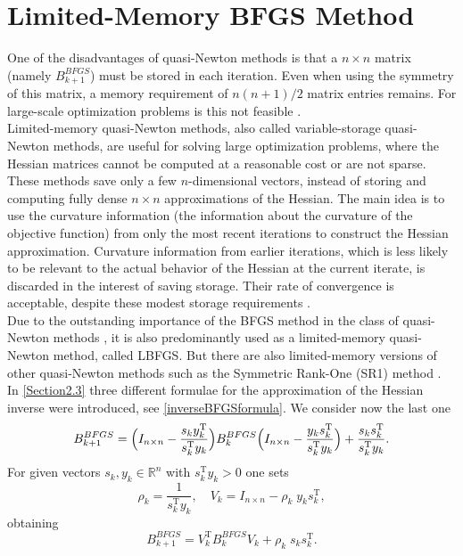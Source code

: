 \section{Limited-Memory BFGS Method}
\label{Section2.6}

One of the disadvantages of quasi-Newton methods is that a $n \times n$ matrix (namely $B^{BFGS}_{k+1}$) must be stored in each iteration. Even when using the symmetry of this matrix, a memory requirement of $n(n+1)/2$ matrix entries remains. For large-scale optimization problems is this not feasible \cite[p.~197]{GeigerKanzow:1999}. \\
Limited-memory quasi-Newton methods, also called variable-storage quasi-Newton methods, are useful for solving large optimization problems, where the Hessian matrices cannot be computed at a reasonable cost or are not sparse. These methods save only a few $n$-dimensional vectors, instead of storing and computing fully dense $n \times n$ approximations of the Hessian. The main idea is to use the curvature information (the information about the curvature of the objective function) from only the most recent iterations to construct the Hessian approximation. Curvature information from earlier iterations, which is less likely to be relevant to the actual behavior of the Hessian at the current iterate, is discarded in the interest of saving storage. Their rate of convergence is acceptable, despite these modest storage requirements \cite[p.~176]{NocedalWright:2006}. \\
Due to the outstanding importance of the BFGS method in the class of quasi-Newton methods \cite[p.~197]{GeigerKanzow:1999}, it is also predominantly used as a limited-memory quasi-Newton method, called LBFGS. But there are also limited-memory versions of other quasi-Newton methods such as the Symmetric Rank-One (SR1) method \cite[p.~177]{NocedalWright:2006}. \\
In \cref{Section2.3} three different formulae for the approximation of the Hessian inverse were introduced, see \cref{inverseBFGSformula}. We consider now the last one 
 \begin{equation*}
    B^{BFGS}_{k+1} = \Big{(} I_{n \times n} - \frac{s_k y^{\mathrm{T}}_k}{s_k^{\mathrm{T}} y_k} \Big{)} B^{BFGS}_k \Big{(} I_{n \times n} - \frac{y_k s^{\mathrm{T}}_k}{s_k^{\mathrm{T}} y_k} \Big{)} + \frac{s_k s^{\mathrm{T}}_k}{s_k^{\mathrm{T}} y_k}.
\end{equation*}    
For given vectors $s_k, y_k \in \mathbb{R}^n$ with $s_k^{\mathrm{T}} y_k > 0$ one sets 
\begin{equation}\label{LimitedMemoryVariables}
    \rho_k = \frac{1}{s^{\mathrm{T}}_{k} y_k} , \quad V_k = I_{n \times n} - \rho_k \; y_k s^{\mathrm{T}}_{k},
\end{equation}
obtaining
\begin{equation}\label{LimitedMemoryFormula}
    B^{BFGS}_{k+1} = V^{\mathrm{T}}_k B^{BFGS}_k V_k + \rho_k \; s_k s_k^{\mathrm{T}}.
\end{equation} 

